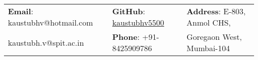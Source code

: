 \documentclass[letterpaper, 10pt]{article}
\begin{document}


\vspace{0.5cm} 
\begin{center}
\begin{tabular}{lll}
\textbf{Email}: kaustubhv@hotmail.com      &
\hspace{0.55in} \textbf{GitHub}: \href{https://github.com/kaustubhv5500}{kaustubhv5500}    &
\hspace{0.4in}  \textbf{Address}: E-803, Anmol CHS,  \\

\hspace{0.45in} kaustubh.v@spit.ac.in      &
\hspace{0.55in} \textbf{Phone}: +91-8425909786   & 
\hspace{0.4in} Goregaon West, Mumbai-104
\end{tabular}
\end{center}


\setlength{\tabcolsep}{8pt}
\end{document}
